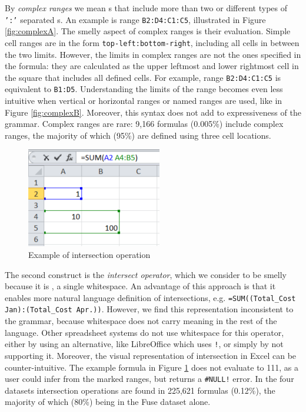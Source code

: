\documentclass[times]{smrauth}
\begin{document}
By \textit{complex ranges} we mean s that include more than two or different types of \texttt{':'} separated s. An example is range \texttt{B2:D4:C1:C5}, illustrated in Figure \ref{fig:complexA}. The smelly aspect of complex ranges is their evaluation. Simple cell ranges are in the form \texttt{top-left:bottom-right}, including all cells in between the two limits. However, the limits in complex ranges are not the ones specified in the formula: they are calculated as the upper leftmost and lower rightmost cell in the square that includes all defined cells. For example, range \texttt{B2:D4:C1:C5} is equivalent to \texttt{B1:D5}. Understanding the limits of the range becomes even less intuitive when vertical or horizontal ranges or named ranges are used, like in Figure \ref{fig:complexB}. Moreover, this syntax does not add to expressiveness of the grammar. Complex ranges are rare: 9,166 formulas (0.005\%) include complex ranges, the majority of which (95\%) are defined using three cell locations.

\begin{figure}
	\centering
	\includegraphics[]{img/intersection}
	\caption{Example of intersection operation}
	\label{Figure:intersection}
\end{figure}

The second construct is the \textit{intersect operator}, which we consider to be smelly because it is \texttt{}, a single whitespace.
An advantage of this approach is that it enables more natural language definition of intersections, e.g. \texttt{=SUM((Total_Cost Jan):(Total_Cost Apr.))}.
However, we find this representation inconsistent to the grammar, because whitespace does not carry meaning in the rest of the language. Other spreadsheet systems do not use whitespace for this operator, either by using an alternative, like LibreOffice which uses \texttt{!}, or simply by not supporting it. Moreover, the visual representation of intersection in Excel can be counter-intuitive. The example formula in Figure \ref{Figure:intersection} does not evaluate to 111, as a user could infer from the marked ranges, but returns a \texttt{\#NULL!} error. In the four datasets intersection operations are found in 225,621	formulas (0.12\%), the majority of which (80\%) being in the Fuse dataset alone.
\end{document}
